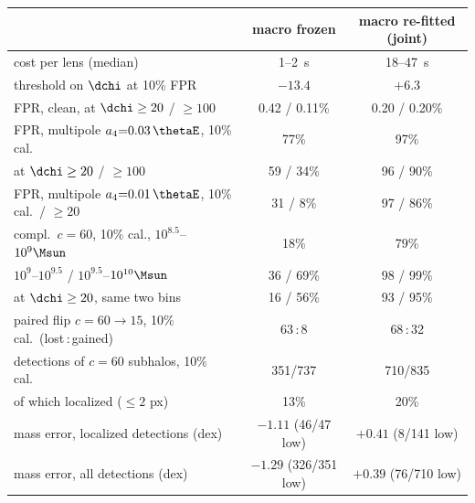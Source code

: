 \begin{tabular}{@{}lcc@{}}
\toprule
 & macro frozen & macro re-fitted (joint) \\
\midrule
cost per lens (median) & 1--2~s & 18--47~s \\
threshold on $\dchi$ at 10\% FPR & $-13.4$ & $+6.3$ \\
FPR, clean, at $\dchi\ge20$ / $\ge100$ & 0.42 / 0.11\% & 0.20 / 0.20\% \\
FPR, multipole $a_4{=}0.03\,\thetaE$, 10\% cal.\ & 77\% & 97\% \\
\quad at $\dchi\ge20$ / $\ge100$ & 59 / 34\% & 96 / 90\% \\
FPR, multipole $a_4{=}0.01\,\thetaE$, 10\% cal.\ / $\ge20$ & 31 / 8\% & 97 / 86\% \\
\midrule
compl.\ $c{=}60$, 10\% cal., $10^{8.5}$--$10^{9}\Msun$ & 18\% & 79\% \\
\quad $10^{9}$--$10^{9.5}$ / $10^{9.5}$--$10^{10}\Msun$ & 36 / 69\% & 98 / 99\% \\
\quad at $\dchi\ge20$, same two bins & 16 / 56\% & 93 / 95\% \\
paired flip $c{=}60\to15$, 10\% cal.\ (lost\,:\,gained) & 63\,:\,8 & 68\,:\,32 \\
\midrule
detections of $c{=}60$ subhalos, 10\% cal.\ & 351/737 & 710/835 \\
of which localized ($\le2$ px) & 13\% & 20\% \\
mass error, localized detections (dex) & $-1.11$ (46/47 low) & $+0.41$ (8/141 low) \\
mass error, all detections (dex) & $-1.29$ (326/351 low) & $+0.39$ (76/710 low) \\
\bottomrule
\end{tabular}
